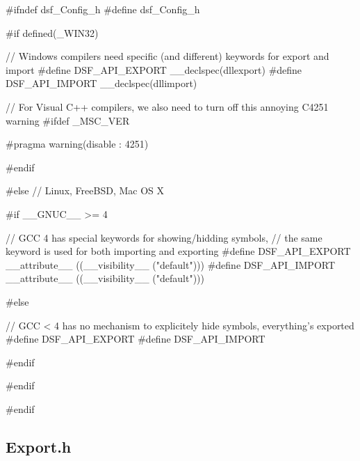 \begin{DoxyCode}
\textcolor{preprocessor}{#ifndef dsf\_Config\_h}
\textcolor{preprocessor}{#define dsf\_Config\_h}

\textcolor{preprocessor}{#if defined(\_WIN32)}

\textcolor{comment}{// Windows compilers need specific (and different) keywords for export and import}
\textcolor{preprocessor}{#define DSF\_API\_EXPORT \_\_declspec(dllexport)}
\textcolor{preprocessor}{#define DSF\_API\_IMPORT \_\_declspec(dllimport)}

\textcolor{comment}{// For Visual C++ compilers, we also need to turn off this annoying C4251 warning}
\textcolor{preprocessor}{#ifdef \_MSC\_VER}

\textcolor{preprocessor}{#pragma warning(disable : 4251)}

\textcolor{preprocessor}{#endif}

\textcolor{preprocessor}{#else // Linux, FreeBSD, Mac OS X}

\textcolor{preprocessor}{#if \_\_GNUC\_\_ >= 4}

\textcolor{comment}{// GCC 4 has special keywords for showing/hidding symbols,}
\textcolor{comment}{// the same keyword is used for both importing and exporting}
\textcolor{preprocessor}{#define DSF\_API\_EXPORT \_\_attribute\_\_ ((\_\_visibility\_\_ ("default")))}
\textcolor{preprocessor}{#define DSF\_API\_IMPORT \_\_attribute\_\_ ((\_\_visibility\_\_ ("default")))}

\textcolor{preprocessor}{#else}

\textcolor{comment}{// GCC < 4 has no mechanism to explicitely hide symbols, everything's exported}
\textcolor{preprocessor}{#define DSF\_API\_EXPORT}
\textcolor{preprocessor}{#define DSF\_API\_IMPORT}

\textcolor{preprocessor}{#endif}

\textcolor{preprocessor}{#endif}


\textcolor{preprocessor}{#endif}
\end{DoxyCode}
 \hypertarget{_start_development_StartDevelopmentCodeConfigurationsExport_h}{}\subsection{Export.\+h}\label{_start_development_StartDevelopmentCodeConfigurationsExport_h}

